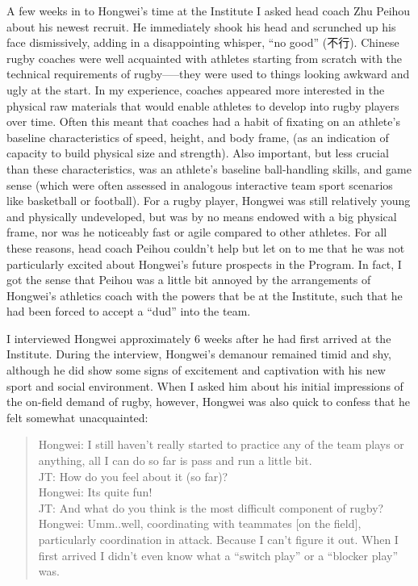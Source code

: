 A few weeks in to Hongwei’s time at the Institute I asked head coach Zhu Peihou about his newest recruit.  He immediately shook his head and scrunched up his face dismissively, adding in a disappointing whisper, ``no good'' (不行).  Chinese rugby coaches were well acquainted with athletes starting from scratch with the technical requirements of rugby—--they were used to things looking awkward and ugly at the start.  In my experience, coaches appeared more interested in the physical raw materials that would enable athletes to develop into rugby players over time.  Often this meant that coaches had a habit of fixating on an athlete's baseline characteristics of speed, height, and body frame, (as an indication of capacity to build physical size and strength).  Also important, but less crucial than these characteristics, was an athlete’s baseline ball-handling skills, and game sense (which were often assessed in analogous interactive team sport scenarios like basketball or football).  For a rugby player, Hongwei was still relatively young and physically undeveloped, but was by no means endowed with a big physical frame, nor was he noticeably fast or agile compared to other athletes.  For all these reasons, head coach Peihou couldn’t help but let on to me that he was not particularly excited about Hongwei's future prospects in the Program.  In fact, I got the sense that Peihou was a little bit annoyed by the arrangements of Hongwei’s athletics coach with the powers that be at the Institute, such that he had been forced to accept a ``dud'' into the team.

I interviewed Hongwei approximately 6 weeks after he had first arrived at the Institute.  During the interview, Hongwei's  demanour remained timid and shy, although he did show some signs of excitement and captivation with his new sport and social environment.  When I asked him about his initial impressions of the on-field demand of rugby, however, Hongwei was also quick to confess that he felt somewhat unacquainted:

\begin{quotation}
  Hongwei: I still haven’t really started to practice any of the team plays or anything, all I can do so far is pass and run a little bit. \\
  JT: How do you feel about it (so far)? \\
  Hongwei: Its quite fun! \\
  JT: And what do you think is the most difficult component of rugby? \\
  Hongwei: Umm..well, coordinating with teammates [on the field], particularly coordination in attack.  Because I can't figure it out. When I first arrived I didn’t even know what a ``switch play'' or a ``blocker play'' was.
\end{quotation}

